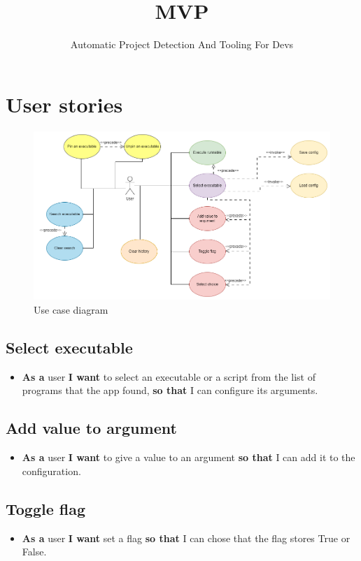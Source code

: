 \documentclass{article}
\title{MVP}
\author{Automatic Project Detection And Tooling For Devs}
\date{}
\begin{document}
\maketitle

\section{User stories}

\begin{figure}[h]
    \centering
    \includegraphics[width=1\linewidth]{img/use_case_diagram.drawio.png}
    \caption{Use case diagram}
    \label{fig:enter-label}
\end{figure}

\subsection{Select executable}
\begin{itemize}
    \item \textbf{As a} user \textbf{I want} to select an executable or a script from the list of programs that the app found, \textbf{so that} I can configure its arguments.
\end{itemize}

\subsection{Add value to argument}
\begin{itemize}
    \item \textbf{As a} user \textbf{I want} to give a value to an argument \textbf{so that} I can add it to the configuration.
\end{itemize}

\subsection{Toggle flag}
\begin{itemize}
    \item \textbf{As a} user \textbf{I want} set a flag \textbf{so that} I can chose that the flag stores True or False.
\end{itemize}
\end{document}
